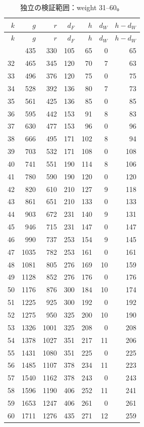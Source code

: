 \documentclass[12pt]{amsart}
\theoremstyle{definition}
\theoremstyle{remark}
\numberwithin{equation}{section}
\numberwithin{equation}{section}
\begin{document}
\endgroup
\Needspace{450pt}
\begingroup\small
\begin{longtable}{rrrrrrr}
\caption{独立の検証範囲：weight 31--60。}\\
\toprule $k$ & $g$ & $r$ & $d_F$ & $h$ & $d_W$ & $h-d_W$\\\midrule\endfirsthead
\toprule $k$ & $g$ & $r$ & $d_F$ & $h$ & $d_W$ & $h-d_W$\\\midrule\endhead
\bottomrule\endfoot
31 & 435 & 330 & 105 & 65 & 0 & 65\\
32 & 465 & 345 & 120 & 70 & 7 & 63\\
33 & 496 & 376 & 120 & 75 & 0 & 75\\
34 & 528 & 392 & 136 & 80 & 7 & 73\\
35 & 561 & 425 & 136 & 85 & 0 & 85\\
36 & 595 & 442 & 153 & 91 & 8 & 83\\
37 & 630 & 477 & 153 & 96 & 0 & 96\\
38 & 666 & 495 & 171 & 102 & 8 & 94\\
39 & 703 & 532 & 171 & 108 & 0 & 108\\
40 & 741 & 551 & 190 & 114 & 8 & 106\\
41 & 780 & 590 & 190 & 120 & 0 & 120\\
42 & 820 & 610 & 210 & 127 & 9 & 118\\
43 & 861 & 651 & 210 & 133 & 0 & 133\\
44 & 903 & 672 & 231 & 140 & 9 & 131\\
45 & 946 & 715 & 231 & 147 & 0 & 147\\
46 & 990 & 737 & 253 & 154 & 9 & 145\\
47 & 1035 & 782 & 253 & 161 & 0 & 161\\
48 & 1081 & 805 & 276 & 169 & 10 & 159\\
49 & 1128 & 852 & 276 & 176 & 0 & 176\\
50 & 1176 & 876 & 300 & 184 & 10 & 174\\
51 & 1225 & 925 & 300 & 192 & 0 & 192\\
52 & 1275 & 950 & 325 & 200 & 10 & 190\\
53 & 1326 & 1001 & 325 & 208 & 0 & 208\\
54 & 1378 & 1027 & 351 & 217 & 11 & 206\\
55 & 1431 & 1080 & 351 & 225 & 0 & 225\\
56 & 1485 & 1107 & 378 & 234 & 11 & 223\\
57 & 1540 & 1162 & 378 & 243 & 0 & 243\\
58 & 1596 & 1190 & 406 & 252 & 11 & 241\\
59 & 1653 & 1247 & 406 & 261 & 0 & 261\\
60 & 1711 & 1276 & 435 & 271 & 12 & 259\\
\end{longtable}
\endgroup
\end{document}
